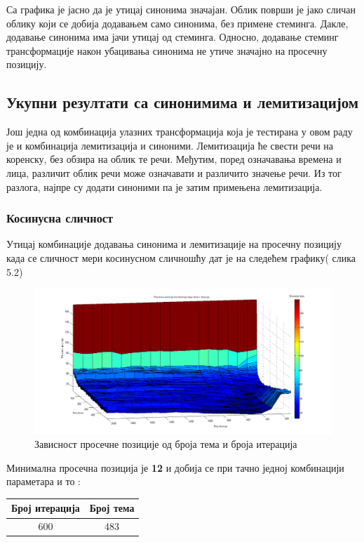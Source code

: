 Са графика је јасно да је утицај синонима значајан. Облик површи је јако сличан облику који се добија додавањем само синонима, без примене стеминга. Дакле, додавање синонима има јачи утицај од стеминга. Односно, додавање стеминг трансформације након убацивања синонима не утиче значајно на просечну позицију. 

\subsection{Укупни резултати са синонимима и лемитизацијом}

Још једна од комбинација улазних трансформација која је тестирана у овом раду је и комбинација лемитизација и синоними. Лемитизација ће свести речи на коренску, без обзира на облик те речи. Међутим, поред означавања времена и лица, различит облик речи може означавати и различито значење речи. Из тог разлога, најпре су додати синоними па је затим примењена лемитизација.

\subsubsection{Косинусна сличност}



Утицај  комбинације додавања синонима и лемитизације на просечну позицију  када се сличност мери косинусном сличношћу дат је на следећем графику( слика 5.2)


		\begin{figure}[H]
    \centering
   \includegraphics[scale=0.3]{./Slike/LemmSyn.png} 
	\caption{Зависност просечне позиције од броја тема и броја итерација}
	\label{fig:slika1}
\end{figure}

Минимална просечна позиција је \textbf{12} и добија се при тачно једној комбинацији параметара и то :

\begin{center}
\begin{tabular}{|c|c|}
\hline
Број итерација & Број тема \\
\hline\hline
600 & 483 \\

\hline
\end{tabular}
\end{center}

